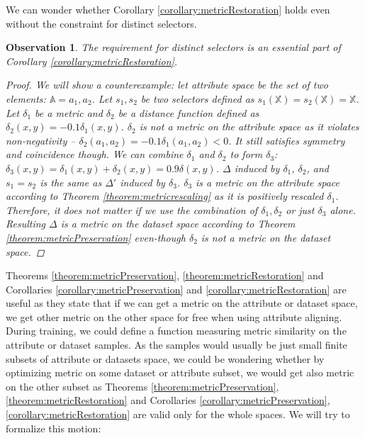 \documentclass{article}
\newtheorem{observation}{Observation}
\newcommand{\attributeDistance}{\delta}
\newcommand{\globalDistance}{\Delta}
\begin{document}
\begin{refsegment}
We can wonder whether Corollary \ref{corollary:metricRestoration} holds even without the constraint for distinct selectors. 
\begin{observation}
	The requirement for distinct selectors is an essential part of Corollary \ref{corollary:metricRestoration}. 
	\begin{proof}
		We will show a counterexample: let attribute space be the set of two elements: $\mathbb{A}={a_1, a_2}$.
		Let $s_1,s_2$ be two selectors defined as $s_1(\mathbb{X})=s_2(\mathbb{X})=\mathbb{X}$. Let $\attributeDistance_1$ be a metric and $\attributeDistance_2$ be a distance function defined as $\attributeDistance_2(x,y)=-0.1\attributeDistance_1(x,y)$. $\attributeDistance_2$ is not a metric on the attribute space as it violates non-negativity -- $\attributeDistance_2(a_1, a_2) = -0.1\attributeDistance_1(a_1, a_2) < 0$. It still satisfies symmetry and coincidence though. We can combine $\attributeDistance_1$ and $\attributeDistance_2$ to form $\attributeDistance_3$: $\attributeDistance_3(x,y) = \attributeDistance_1(x,y)+\attributeDistance_2(x,y)=0.9\attributeDistance(x,y)$. $\globalDistance$ induced by $\attributeDistance_1$, $\attributeDistance_2$, and $s_1 = s_2$ is the same as $\globalDistance'$ induced by $\attributeDistance_3$. $\attributeDistance_3$ is a metric on the attribute space according to Theorem \ref{theorem:metricrescaling} as it is positively rescaled $\attributeDistance_1$. Therefore, it does not matter if we use the combination of $\attributeDistance_1,\attributeDistance_2$ or just $\attributeDistance_3$ alone. Resulting $\globalDistance$ is a metric on the dataset space according to Theorem \ref{theorem:metricPreservation} even-though $\attributeDistance_2$ is not a metric on the dataset space.
	\end{proof}
\end{observation}

Theorems \ref{theorem:metricPreservation}, \ref{theorem:metricRestoration} and Corollaries \ref{corollary:metricPreservation} and  \ref{corollary:metricRestoration} are useful as they state that if we can get a metric on the attribute or dataset space, we get other metric on the other space for free when using attribute aligning. During training, we could define a function measuring metric similarity on the attribute or dataset samples. As the samples would usually be just small finite subsets of attribute or datasets space, we could be wondering whether by optimizing metric on some dataset or attribute subset, we would get also metric on the other subset as Theorems \ref{theorem:metricPreservation}, \ref{theorem:metricRestoration} and Corollaries \ref{corollary:metricPreservation}, \ref{corollary:metricRestoration} are valid only for the whole spaces. We will try to formalize this motion:


\end{refsegment}
\end{document}
